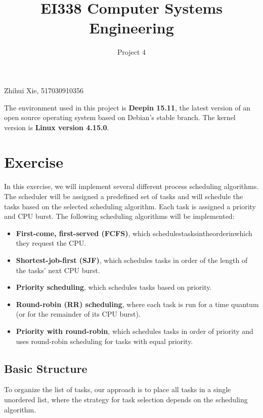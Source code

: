 \documentclass{article}
\title{EI338 Computer Systems Engineering}
\author{Project 4}
\begin{document}
\maketitle

\begin{center}
    Zhihui Xie, 517030910356
\end{center}

The environment used in this project is \textbf{Deepin 15.11}, the latest version of an open source operating system based on Debian's stable branch. The kernel version is \textbf{Linux version 4.15.0}.

\section*{Exercise}
In this exercise, we will implement several different process scheduling algorithms. The scheduler will be assigned a predefined set of tasks and will
schedule the tasks based on the selected scheduling algorithm. Each task is
assigned a priority and CPU burst. The following scheduling algorithms will
be implemented:

\begin{itemize}
    \item \textbf{First-come, first-served (FCFS)}, which schedulestasksintheorderinwhich
    they request the CPU.

    \item \textbf{Shortest-job-first (SJF)}, which schedules tasks in order of the length of the
    tasks’ next CPU burst.

    \item \textbf{Priority scheduling}, which schedules tasks based on priority.
    
    \item \textbf{Round-robin (RR) scheduling}, where each task is run for a time quantum
    (or for the remainder of its CPU burst).

    \item \textbf{Priority with round-robin}, which schedules tasks in order of priority and
    uses round-robin scheduling for tasks with equal priority.
\end{itemize}

\subsection*{Basic Structure}
To organize the list of tasks,  our approach is to place all tasks in a single unordered list, where the strategy for task selection depends on the scheduling
algorithm. 
\end{document}

